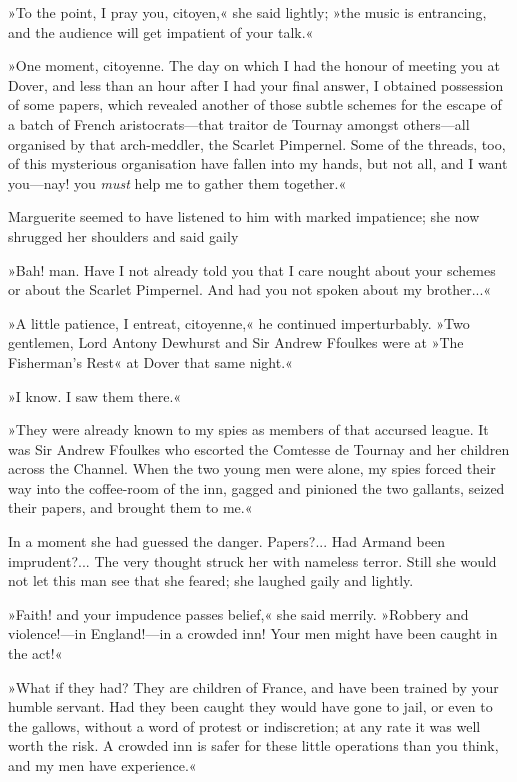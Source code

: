 »To the point, I pray you, citoyen,« she said lightly; »the music is entrancing, and the audience will get impatient of your talk.«

»One moment, citoyenne. The day on which I had the honour of meeting you at Dover, and less than an hour after I had your final answer, I obtained possession of some papers, which revealed another of those subtle schemes for the escape of a batch of French aristocrats\allowbreak---\allowbreak that traitor de Tournay amongst others\allowbreak---\allowbreak all organised by that arch-meddler, the Scarlet Pimpernel. Some of the threads, too, of this mysterious organisation have fallen into my hands, but not all, and I want you\allowbreak---\allowbreak nay! you \textit{must} help me to gather them together.«

Marguerite seemed to have listened to him with marked impatience; she now shrugged her shoulders and said gaily\longdash


»Bah! man. Have I not already told you that I care nought about your schemes or about the Scarlet Pimpernel. And had you not spoken about my brother...«

»A little patience, I entreat, citoyenne,« he continued imperturbably. »Two gentlemen, Lord Antony Dewhurst and Sir Andrew Ffoulkes were at »The Fisherman's Rest« at Dover that same night.«

»I know. I saw them there.«

»They were already known to my spies as members of that accursed league. It was Sir Andrew Ffoulkes who escorted the Comtesse de Tournay and her children across the Channel. When the two young men were alone, my spies forced their way into the coffee-room of the inn, gagged and pinioned the two gallants, seized their papers, and brought them to me.«

In a moment she had guessed the danger. Papers?... Had Armand been imprudent?... The very thought struck her with nameless terror. Still she would not let this man see that she feared; she laughed gaily and lightly.

»Faith! and your impudence passes belief,« she said merrily. »Robbery and violence!\allowbreak---\allowbreak in England!\allowbreak---\allowbreak in a crowd\-ed inn! Your men might have been caught in the act!«

»What if they had? They are children of France, and have been trained by your humble servant. Had they been caught they would have gone to jail, or even to the gallows, without a word of protest or indiscretion; at any rate it was well worth the risk. A crowded inn is safer for these little operations than you think, and my men have experience.«


